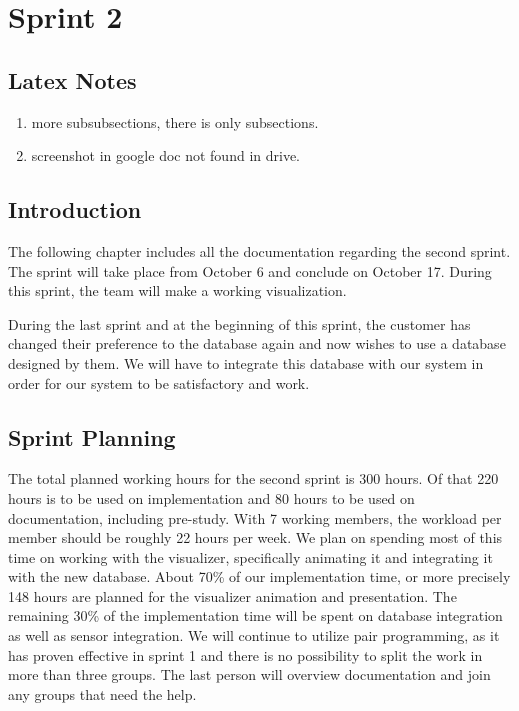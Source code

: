 \documentclass[../document]{subfiles}
\begin{document}
\section{Sprint 2}
\subsection{Latex Notes}
\begin{enumerate}
\item
more subsubsections, there is only subsections.
\item
screenshot in google doc not found in drive.
\end{enumerate}
\subsection{Introduction}
The following chapter includes all the documentation regarding the second sprint. The sprint will take place from October 6 and conclude on October 17. During this sprint, the team will make a working visualization.

During the last sprint and at the beginning of this sprint, the customer has changed their preference to the database again and now wishes to use a database designed by them. We will have to integrate this database with our system in order for our system to be satisfactory and work.

\subsection{Sprint Planning}
The total planned working hours for the second sprint is 300 hours. Of that 220 hours is to be used on implementation and 80 hours to be used on documentation, including pre-study. With 7 working members, the workload per member should be roughly 22 hours per week. We plan on spending most of this time on working with the visualizer, specifically animating it and integrating it with the new database. About 70\% of our implementation time, or more precisely 148 hours are planned for the visualizer animation and presentation. The remaining 30\% of the implementation time will be spent on database integration as well as sensor integration. We will continue to utilize pair programming, as it has proven effective in sprint 1 and there is no possibility to split the work in more than three groups. The last person will overview documentation and join any groups that need the help. 
\end{document}
